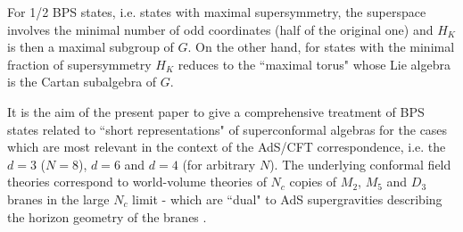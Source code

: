\documentclass[a4paper,12pt]{article}
\begin{document}
For 1/2 BPS states, i.e. states with maximal supersymmetry, the 
superspace involves the minimal number of odd coordinates (half of 
the original one) and $H_K$ is then a maximal subgroup of $G$. On 
the other hand, for states with the minimal fraction of 
supersymmetry $H_K$ reduces to the ``maximal torus" whose Lie 
algebra is the Cartan subalgebra of $G$. 

It is the aim of the present paper to give a comprehensive 
treatment of BPS states related to ``short representations" of 
superconformal algebras for the cases which are most relevant in 
the context of the AdS/CFT correspondence, i.e. the $d=3$ 
($N=8$), $d=6$ and $d=4$ (for arbitrary $N$). The underlying 
conformal field theories correspond to world-volume theories of 
$N_c$ copies of $M_2$, $M_5$ and $D_3$ branes in the large $N_c$ 
limit \cite{AOY}-\cite{ckvp} which are ``dual" to AdS 
supergravities describing the horizon geometry of the branes 
\cite{AGMOO}. 
\end{document}
